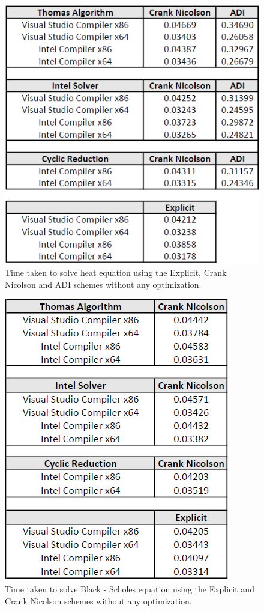 \documentclass[12pt, oneside]{book}
\theoremstyle{plain}
\theoremstyle{definition}
\begin{document}
\begin{figure}[!htb]
    \centering
        \includegraphics[scale=0.6]{heatNotOptimized.png}
    \caption{Time taken to solve heat equation using the Explicit, Crank Nicolson and ADI schemes  without any optimization.}
\end{figure}

\begin{figure}[!htb]
    \centering
        \includegraphics[scale=0.6]{bsNotOptimized.png}
    \caption{Time taken to solve Black - Scholes equation using the Explicit and Crank Nicolson schemes without any optimization.}
\end{figure}
\end{document}
